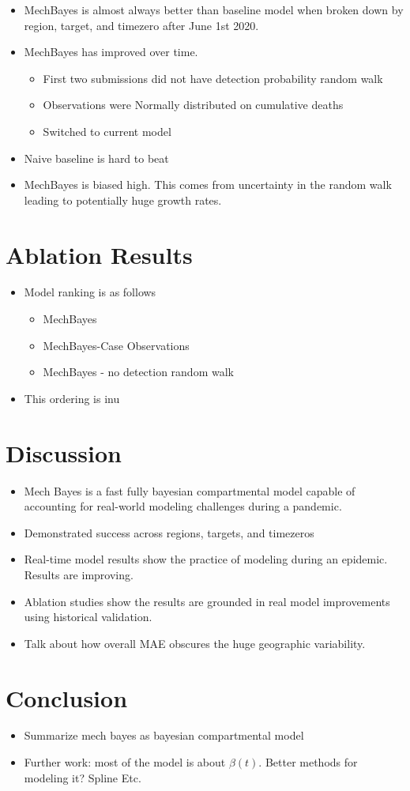 \documentclass[11pt]{amsart}
\begin{document}
\begin{itemize}
\item MechBayes is almost always better than baseline model when broken down by region, target, and timezero after June 1st 2020.
\item MechBayes has improved over time.
\begin{itemize}
\item First two submissions did not have detection probability random walk
\item Observations were Normally distributed on cumulative deaths
\item Switched to current model
\end{itemize}
\item Naive baseline is hard to beat
\item MechBayes is biased high. This comes from uncertainty in the random walk leading to potentially huge growth rates. 
\end{itemize}   
   
   
   
   \section{Ablation Results}

   \begin{itemize}
   \item Model ranking is as follows
   \begin{itemize}
   \item MechBayes
   \item MechBayes-Case Observations
   \item MechBayes - no detection random walk
   \end{itemize}
   \item This ordering is inu
   \end{itemize}


\section{Discussion}
\begin{itemize}
\item Mech Bayes is a fast fully bayesian compartmental model capable of accounting for real-world modeling challenges during a pandemic.
\item Demonstrated success across regions, targets, and timezeros
\item Real-time model results show the practice of modeling during an epidemic. Results are improving.
\item Ablation studies show the results are grounded in real model improvements using historical validation.
\item Talk about how overall MAE obscures the huge geographic variability. 
\end{itemize}

\section{Conclusion}

\begin{itemize}
\item Summarize mech bayes as bayesian compartmental model
\item Further work: most of the model is about $\beta(t)$. Better methods for modeling it? Spline Etc.
\end{itemize}





\end{document}
